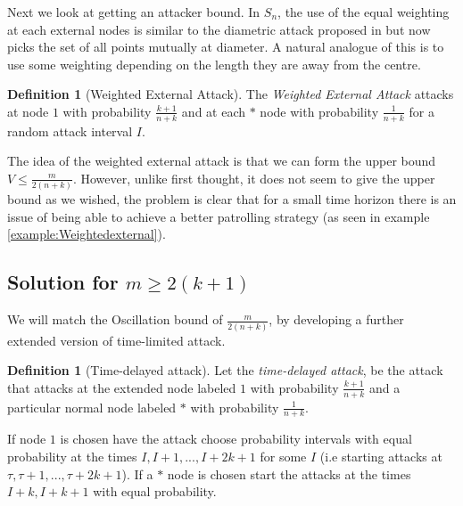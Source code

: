 \documentclass[a4paper,10pt]{article}
\theoremstyle{definition}
\newtheorem{definition}[theorem]{Definition}
\theoremstyle{definition}
\theoremstyle{remark}
\theoremstyle{definition}
\begin{document}
Next we look at getting an attacker bound. In $S_{n}$, the use of the equal weighting at each external nodes is similar to the diametric attack proposed in \cite{Alpern2011} but now picks the set of all points mutually at diameter. A natural analogue of this is to use some weighting depending on the length they are away from the centre.

\begin{definition}[Weighted External Attack]
The \textit{Weighted External Attack} attacks at node $1$ with probability $\frac{k+1}{n+k} $ and at each $*$ node with probability $\frac{1}{n+k}$ for a random attack interval $I$.
\end{definition}

The idea of the weighted external attack is that we can form the upper bound $V \leq \frac{m}{2(n+k)}$. However, unlike first thought, it does not seem to give the upper bound as we wished, the problem is clear that for a small time horizon there is an issue of being able to achieve a better patrolling strategy (as seen in example \ref{example:Weightedexternal}).



\subsection{Solution for $m \geq 2(k+1)$}

We will match the Oscillation bound of $\frac{m}{2(n+k)}$, by developing a further extended version of time-limited attack.

\begin{definition}[Time-delayed attack]
Let the \textit{time-delayed attack}, be the attack that attacks at the extended node labeled $1$ with probability $\frac{k+1}{n+k}$ and a particular normal node labeled $*$ with probability $\frac{1}{n+k}$.

If node $1$ is chosen have the attack choose probability intervals with equal probability at the times $I,I+1,...,I+2k+1$ for some $I$ (i.e starting attacks at $\tau, \tau+1,...,\tau+2k+1$). If a $*$ node is chosen start the attacks at the times $I+k,I+k+1$ with equal probability.
\end{definition}
\end{document}
